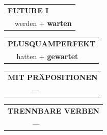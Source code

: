\documentclass[10pt,a4paper]{revtex4-2}
\begin{document}
\begin{verbbox}
\begin{tabular}{rl}
    \multicolumn{2}{l}{\textbf{FUTURE I} }\\
  &  werden + \textbf{warten}\\
 
  \end{tabular}
\hfill
   \begin{tabular}{rl}
      \multicolumn{2}{l}{\textbf{PLUSQUAMPERFEKT}}\\
  &  hatten + \textbf{gewartet}\\
  \end{tabular}
  
  \vspace{10pt}



\begin{tabular}{lll}
\multicolumn{3}{l}{\textbf{MIT PRÄPOSITIONEN}}\\
& ---\\
\end{tabular}
\hfill
\begin{tabular}{lll}
\multicolumn{3}{l}{\textbf{TRENNBARE VERBEN}}\\
& ---\\
\end{tabular}

  \vspace{-5pt}

\end{verbbox}
\end{document}
